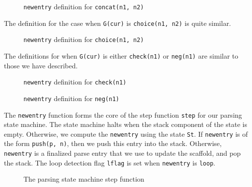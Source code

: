 \documentclass[sigplan,10pt,anonymous,review]{acmart}\settopmatter{printfolios=true,printccs=false,printacmref=false}
\begin{document}
\begin{CCSXML}
\begin{figure}[h!]
  
    \vspace*{-4mm}
\caption{\texttt{newentry} definition for \texttt{concat(n1, n2)}}
\label{pvs:newentry_concat}
\end{figure}

The definition for the case when \texttt{G(cur)} is \texttt{choice(n1, n2)}
is quite similar.
\begin{figure}[h!]
  
    \vspace*{-4mm}
\caption{\texttt{newentry} definition for \texttt{choice(n1, n2)}}
\label{pvs:newentry_choice}
\end{figure}

The definitions for when \texttt{G(cur)} is either \texttt{check(n1)}
or \texttt{neg(n1)} are similar to those we have described.

\begin{figure}[h!]
  
    \vspace*{-4mm}
\caption{\texttt{newentry} definition for \texttt{check(n1)}}
\label{pvs:newentry_check}
\end{figure}

\begin{figure}[h!]
  
    \vspace*{-4mm}
\caption{\texttt{newentry} definition for \texttt{neg(n1)}}
\label{pvs:newentry_neg}
\end{figure}

The \texttt{newentry} function forms the core of the step function \texttt{step}
for our parsing state machine.  The state machine halts when
the stack component of the state is empty.  Otherwise,
we compute the \texttt{newentry} using the state \texttt{St}.
If \texttt{newentry} is of the form \texttt{push(p, n)}, then
we push this entry into the stack.  Otherwise, \texttt{newentry}
is a finalized parse entry that we use to update the scaffold, and pop the stack.
The loop detection flag \texttt{lflag} is set when \texttt{newentry} is \texttt{loop}.

\begin{figure}[h!]
  
    \vspace*{-4mm}
\caption{The parsing state machine step function}
\label{pvs:step}
\end{figure}


\end{CCSXML}
\end{document}
